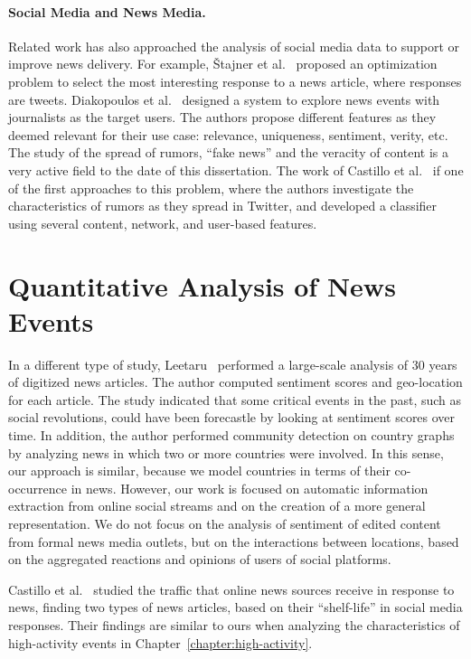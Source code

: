 \paragraph{Social Media and News Media.}
%
Related work has also approached the analysis of social media data to support or
improve news delivery. 
%
For example, \v{S}tajner et al.~\cite{Stajner:2013:ASS:2487575.2487659} proposed
an optimization problem to select the most interesting response to a news
article, where responses are tweets.
%
Diakopoulos et
al.~\cite{Diakopoulos:2012:FAS:2207676.2208409,diakopoulos2010diamonds} designed
a system to explore news events with journalists as the target users.
%
The authors propose different features as they deemed relevant for their use
case: relevance, uniqueness, sentiment, verity, etc. 
%
The study of the spread of rumors, ``fake news'' and the veracity of content is
a very active field to the date of this dissertation.
%
The work of Castillo et al.~\cite{castillo2011information} if one of the first
approaches to this problem, where the authors investigate the characteristics of
rumors as they spread in Twitter, and developed a classifier using several
content, network, and user-based features.



\section{Quantitative Analysis of News Events}

In a different type of study, Leetaru~\cite{leetaru2011culturomics} performed a
large-scale analysis of 30 years of digitized news articles.  
%
The author computed sentiment scores and geo-location for each article.
%
The study indicated that some critical events in the past, such as social
revolutions, could have been forecastle by looking at sentiment scores over
time.
%
In addition, the author performed community detection on country graphs by
analyzing news in which two or more countries were involved.  
%
In this sense, our approach is similar, because we model countries in terms of
their co-occurrence in news. 
%
However, our work is focused on automatic information extraction from online
social streams and on the creation of a more general representation.  
%
We do not focus on the analysis of sentiment of edited content from formal news
media outlets, but on the interactions between locations, based on the
aggregated reactions and opinions of users of social platforms.
%

Castillo et al.~\cite{Castillo:2014} studied the traffic
that online news sources receive in response to news, finding two types of news
articles, based on their ``shelf-life'' in social media responses. 
%
Their findings are similar to ours when analyzing the characteristics of
high-activity events in Chapter~\ref{chapter:high-activity}.


